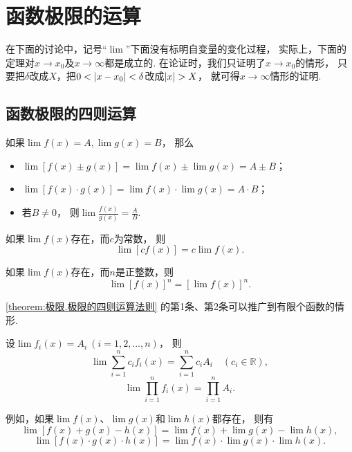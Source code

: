 \section{函数极限的运算}
在下面的讨论中，记号“\(\lim\)”下面没有标明自变量的变化过程，
实际上，下面的定理对\(x \to x_0\)及\(x \to \infty\)都是成立的.
在论证时，我们只证明了\(x \to x_0\)的情形，
只要把\(\delta\)改成\(X\)，把\(0<\abs{x-x_0}<\delta\)改成\(\abs{x}>X\)，
就可得\(x\to\infty\)情形的证明.

\subsection{函数极限的四则运算}
\begin{theorem}\label{theorem:极限.极限的四则运算法则}
如果\(\lim f(x) = A,
\lim g(x) = B\)，
那么\begin{itemize}
	\item \(\lim [f(x) \pm g(x)] = \lim f(x) \pm \lim g(x) = A \pm B\)；
	\item \(\lim [f(x) \cdot g(x)] = \lim f(x) \cdot \lim g(x) = A \cdot B\)；
	\item 若\(B\neq0\)，
	则\(\lim \frac{f(x)}{g(x)} = \frac{A}{B}\).
\end{itemize}
\end{theorem}

\begin{corollary}
如果\(\lim f(x)\)存在，而\(c\)为常数，
则\[
	\lim [c f(x)] = c \lim f(x).
\]
\end{corollary}

\begin{corollary}
如果\(\lim f(x)\)存在，而\(n\)是正整数，则\[\lim [f(x)]^n = [\lim f(x)]^n.\]
\end{corollary}

\cref{theorem:极限.极限的四则运算法则} 的第1条、第2条可以推广到有限个函数的情形.
\begin{corollary}
设\(\lim f_i(x) = A_i\ (i=1,2,\dotsc,n)\)，
则\[
	\lim \sum_{i=1}^n c_i f_i(x) = \sum_{i=1}^n c_i A_i
	\quad(c_i\in\mathbb{R}),
\]\[
	\lim \prod_{i=1}^n f_i(x) = \prod_{i=1}^n A_i.
\]
\end{corollary}
例如，如果\(\lim f(x)\)、\(\lim g(x)\)和\(\lim h(x)\)都存在，
则有\[
	\lim[f(x) + g(x) - h(x)] = \lim f(x) + \lim g(x) - \lim h(x),
\]\[
	\lim[f(x) \cdot g(x) \cdot h(x)] = \lim f(x) \cdot \lim g(x) \cdot \lim h(x).
\]


